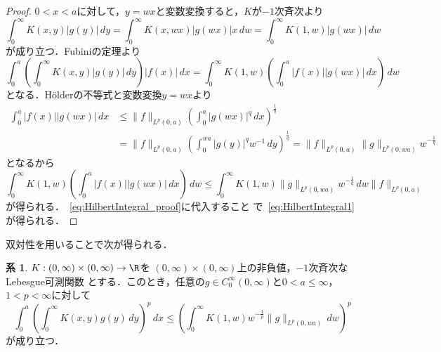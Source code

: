 \documentclass[paper=a4,
fontsize=12pt,
reqno,
uplatex,
dvipdfmx]{jlreq}
\theoremstyle{definition} %
\newtheorem{corollary}[theorem]{系}
\begin{document}
\begin{proof}
 $0<x<a$に対して，$y=wx$と変数変換すると，$K$が$-1$次斉次より
 \begin{equation}
  \int_0^\infty
   K(x,y)|g(y)|
   \,dy
   =
   \int_0^\infty
   K(x,wx)|g(wx)|
   x
   \,dw
   =
   \int_0^\infty
   K(1,w)|g(wx)|
   \,dw
 \end{equation}
 が成り立つ．Fubiniの定理より
 \begin{equation}
  \label{eq:HilbertIntegral_proof}
  \int_0^a
   \left(
     \int_0^\infty
   K(x,y)|g(y)|
   \,dy
   \right)
   |f(x)|
   \,dx
   =
   \int_0^\infty
   K(1,w)
   \left(
    \int_0^a
    |f(x)|
    |g(wx)|
    \,dx
   \right)
   \,dw
 \end{equation}
 となる．H\"olderの不等式と変数変換$y=wx$より
 \begin{equation}
  \begin{split}
   \int_0^a
   |f(x)|
   |g(wx)|
   \,dx
   &\leq
   \|f\|_{L^p(0,a)}
   \left(
   \int_0^a
   |g(wx)|^q
   \,dx
   \right)^{\frac{1}{q}}
   \\
   &=
   \|f\|_{L^p(0,a)}
   \left(
   \int_0^{wa}
   |g(y)|^q
   w^{-1}\,dy
   \right)^{\frac{1}{q}}
   =
   \|f\|_{L^p(0,a)}
   \|g\|_{L^p(0,wa)}
   w^{-\frac{1}{q}}
  \end{split} 
 \end{equation}
 となるから
 \begin{equation}
  \int_0^\infty
   K(1,w)
   \left(
    \int_0^a
    |f(x)|
    |g(wx)|
    \,dx
   \right)
   \,dw
   \leq
   \int_0^\infty
   K(1,w)
   \|g\|_{L^p(0,wa)}
   w^{-\frac{1}{q}}
   \,dw
   \|f\|_{L^p(0,a)}
 \end{equation}
 が得られる．~\eqref{eq:HilbertIntegral_proof}に代入すること
 で~\eqref{eq:HilbertIntegral1}が得られる．
\end{proof}

双対性を用いることで次が得られる．

\begin{corollary}
 $K:(0,\infty)\times(0,\infty)\rightarrow\R$を
 $(0,\infty)\times(0,\infty)$上の非負値，$-1$次斉次なLebesgue可測関数
 とする．このとき，任意の$g\in C_0^\infty(0,\infty)$と$0<a\leq\infty$，
 $1<p<\infty$に対して
 \begin{equation}
  \label{eq:HilbertIntegral2}
  \int_0^a
   \left(
   \int_0^\infty
   K(x,y)g(y)
   \,dy
   \right)^p
   \,dx
   \leq
   \left(
   \int_0^\infty
   K(1,w)
   w^{-\frac{1}{p}}
   \|g\|_{L^p(0,wa)}
   \,dw
   \right)^p
 \end{equation}
 が成り立つ．
\end{corollary}
\end{document}
